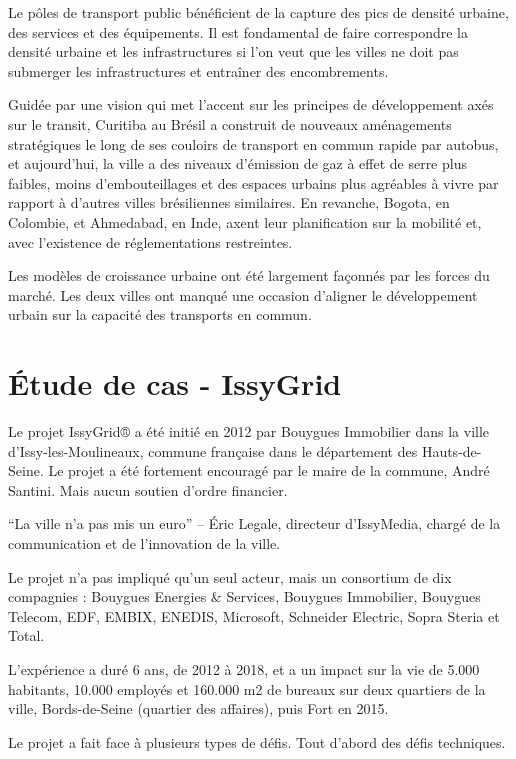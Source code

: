 Le pôles de transport public bénéficient de la capture des pics de densité urbaine,
des services et des équipements. Il est fondamental de faire correspondre la densité urbaine et
les infrastructures si l'on veut que les villes ne doit pas submerger les infrastructures
et entraîner des encombrements.

Guidée par une vision qui met l'accent sur les principes de développement axés sur le transit,
Curitiba au Brésil a construit de nouveaux aménagements stratégiques le long de ses couloirs de transport
en commun rapide par autobus, et aujourd'hui, la ville a des niveaux d'émission de gaz à effet de serre plus
faibles, moins d'embouteillages et des espaces urbains plus agréables à vivre par rapport à d'autres
villes brésiliennes similaires. En revanche, Bogota, en Colombie, et Ahmedabad, en Inde, axent leur
planification sur la mobilité et, avec l'existence de réglementations restreintes.

Les modèles de croissance urbaine ont été largement façonnés par les forces du marché. Les deux villes
ont manqué une occasion d'aligner le développement urbain sur la capacité des transports en commun.

\section{Étude de cas - IssyGrid}
Le projet IssyGrid® a été initié en 2012 par Bouygues Immobilier dans la ville d'Issy-les-Moulineaux,
commune française dans le département des Hauts-de-Seine. Le projet a été fortement encouragé par le
maire de la commune, André Santini. Mais aucun soutien d'ordre financier.

``La ville n’a pas mis un euro'' --  Éric Legale, directeur d’IssyMedia, chargé de la communication et
de l’innovation de la ville.

Le projet n'a pas impliqué qu'un seul acteur, mais un consortium de dix compagnies :
Bouygues Energies \& Services, Bouygues Immobilier, Bouygues Telecom, EDF, EMBIX, ENEDIS,
Microsoft, Schneider Electric, Sopra Steria et Total.

L'expérience a duré 6 ans, de 2012 à 2018, et a un impact sur la vie de 5.000 habitants, 10.000 employés
et 160.000 m2 de bureaux sur deux quartiers de la ville, Bords-de-Seine (quartier des affaires),
puis Fort en 2015.

Le projet a fait face à plusieurs types de défis. Tout d'abord des défis techniques.

